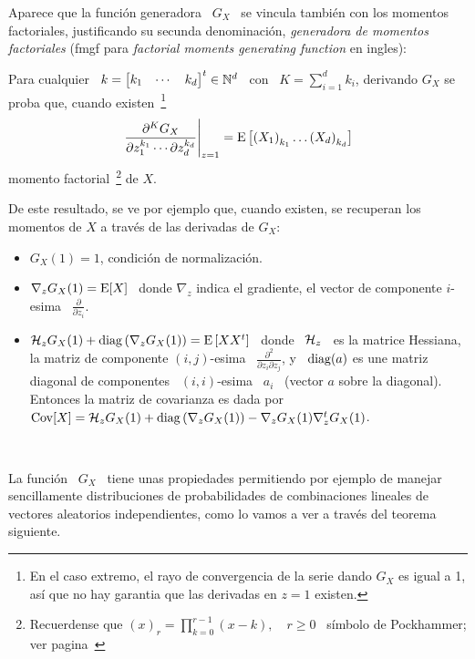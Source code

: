 Aparece  que la  funci\'on generadora  \ $G_X$  \ se  vincula tambi\'en  con los
momentos factoriales, justificando su secunda denominaci\'on, {\em generadora de
  momentos factoriales}  (fmgf para {\em factorial  moments generating function}
en ingles):
%
\begin{lema}
  Para cualquier \  $k = \begin{bmatrix} k_1 & \cdots  & k_d \end{bmatrix}^t \in
  \mathbb{N}^d$ \ con \ $K =  \sum_{i=1}^d k_i$, derivando $G_X$ se proba que, cuando
  existen~\footnote{En el  caso extremo,  el rayo de  convergencia de  la serie
    dando $G_X$ es igual a 1, as\'i  que no hay garantia que las derivadas en $z
    = 1$ existen.}
  \[
  \left.\frac{\partial^K     G_X}{\partial     z_1^{k_1}     \cdots     \partial
      z_d^{k_d}}\right|_{z=1}  =  \operatorname{E}\left[  \left(  X_1  \right)_{k_1}  \ldots
    \left( X_d \right)_{k_d} \right]
  \]
  momento factorial~\footnote{Recuerdense que  $(x)_r = \prod_{k=0}^{r-1} (x-k),
    \quad     r     \ge     0$     \    s\'imbolo     de     Pockhammer;     ver
    pagina~\pageref{MP:Pockhammer}}  de   $X$.
\end{lema}

De  este resultado,  se ve  por ejemplo  que, cuando  existen, se  recuperan los
momentos de $X$ a trav\'es de las derivadas de $G_X$:
%
\begin{itemize}
\item $G_X(1) = 1$, condici\'on de normalizaci\'on.
%
\item $\nabla_z G_X(1) = \operatorname{E}[X]$ \ donde $\nabla_z$ indica el gradiente, \ie el
  vector de componente $i$-esima \ $\frac{\partial}{\partial z_i}$.
%
\item $\mathcal{H}_z G_X(1)  + \operatorname{diag}\left( \nabla_z G_X(1) \right)  = \operatorname{E}\left[ X X^t
  \right]$  \ donde  \ $\mathcal{H}_z$  \ es  la matrice  Hessiana, \ie  la  matriz de
  componente $(i,j)$-esima \ $\frac{\partial^2}{\partial z_i \partial z_j}$, y \
  $\operatorname{diag}(a)$ es  une matriz  diagonal de componentes  \ $(i,i)$-esima \  $a_i$ \
  (vector $a$ sobre la diagonal).  Entonces  la matriz de covarianza es dada por
  \ $\operatorname{Cov}[X] =  \mathcal{H}_z G_X(1) + \operatorname{diag}\left( \nabla_z  G_X(1) \right) - \nabla_z
  G_X(1) \nabla_z^t G_X(1)$.
\end{itemize}

\

La funci\'on \ $G_X$ \ tiene unas propiedades permitiendo por ejemplo de manejar
sencillamente  distribuciones  de probabilidades  de  combinaciones lineales  de
vectores aleatorios independientes,  como lo vamos a ver  a trav\'es del teorema
siguiente.

